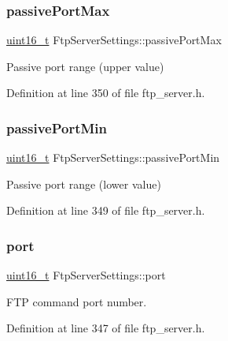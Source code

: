 \subsubsection{\texorpdfstring{passive\+Port\+Max}{passivePortMax}}
{\footnotesize\ttfamily \hyperlink{stdint_8h_a273cf69d639a59973b6019625df33e30}{uint16\+\_\+t} Ftp\+Server\+Settings\+::passive\+Port\+Max}



Passive port range (upper value) 



Definition at line 350 of file ftp\+\_\+server.\+h.

\mbox{\label{structFtpServerSettings_a73f929e99c294e6d04bf3a3306676aa1}} 
\subsubsection{\texorpdfstring{passive\+Port\+Min}{passivePortMin}}
{\footnotesize\ttfamily \hyperlink{stdint_8h_a273cf69d639a59973b6019625df33e30}{uint16\+\_\+t} Ftp\+Server\+Settings\+::passive\+Port\+Min}



Passive port range (lower value) 



Definition at line 349 of file ftp\+\_\+server.\+h.

\mbox{\label{structFtpServerSettings_a147e45ee6c047a4fdd0cd5b8f86b9dee}} 
\subsubsection{\texorpdfstring{port}{port}}
{\footnotesize\ttfamily \hyperlink{stdint_8h_a273cf69d639a59973b6019625df33e30}{uint16\+\_\+t} Ftp\+Server\+Settings\+::port}



F\+TP command port number. 



Definition at line 347 of file ftp\+\_\+server.\+h.

\mbox{\label{structFtpServerSettings_aa954f00cecd495bc7a3304a9f5e15391}} 
